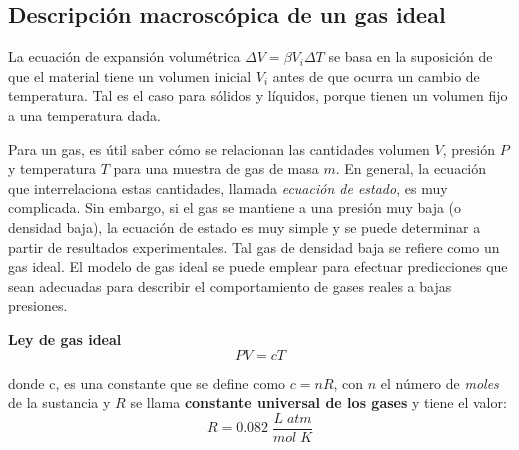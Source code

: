 \subsection{Descripción macroscópica de un gas ideal}

  \PN La ecuación de expansión volumétrica $\Delta V = \beta V_{i} \Delta T$ se basa en la suposición de que el material
  tiene un volumen inicial $V_{i}$ antes de que ocurra un cambio de temperatura. Tal es el caso para sólidos y líquidos,
  porque tienen un volumen fijo a una temperatura dada.

  \PN Para un gas, es útil saber cómo se relacionan las cantidades volumen $V$, presión $P$ y temperatura $T$ para una
  muestra de gas de masa $m$. En general, la ecuación que interrelaciona estas cantidades, llamada \textit{ecuación de
  estado}, es muy complicada. Sin embargo, si el gas se mantiene a una presión muy baja (o densidad baja), la ecuación
  de estado es muy simple y se puede determinar a partir de resultados experimentales. Tal gas de densidad baja se
  refiere como un gas ideal. El modelo de gas ideal se puede emplear para efectuar predicciones que sean adecuadas para
  describir el comportamiento de gases reales a bajas presiones.

  \vspace{3mm}
  \PN \textbf{Ley de gas ideal}
  \begin{equation*}
    P V = c T
  \end{equation*}

  \PN donde c, es una constante que se define como $c = nR$, con $n$ el número de \textit{moles} de la sustancia y $R$
  se llama \textbf{constante universal de los gases} y tiene el valor:
  \begin{equation*}
    R = 0.082 \; \frac{L \; atm}{mol \; K}
  \end{equation*}
